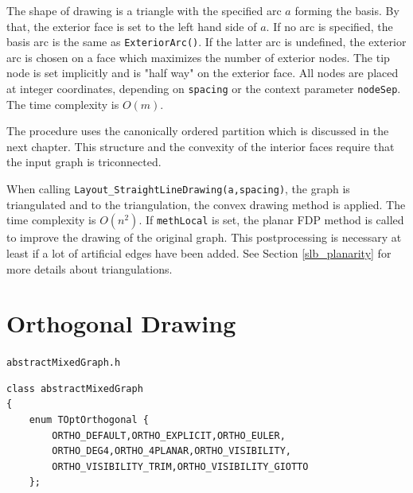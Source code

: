 \documentclass[a4paper,11pt,twoside]{book}
\begin{document}
\begin{multicols}{2}
The shape of drawing is a triangle with the specified arc $a$ forming the basis.
By that, the exterior face is set to the left hand side of $a$. If no arc is
specified, the basis arc is the same as \verb/ExteriorArc()/. If the latter arc
is undefined, the exterior arc is chosen on a face which maximizes the number
of exterior nodes. The tip node is set implicitly and is "half way" on the
exterior face. All nodes are placed at integer coordinates, depending on
\verb/spacing/ or the context parameter \verb/nodeSep/. The time complexity is
$O(m)$.

The procedure uses the canonically ordered partition which is discussed in the
next chapter. This structure and the convexity of the interior faces require
that the input graph is triconnected.

When calling \verb/Layout_StraightLineDrawing(a,spacing)/, the graph is
triangulated and to the triangulation, the convex drawing method is applied.
The time complexity is $O(n^2)$. If \verb/methLocal/ is set, the planar FDP
method is called to improve the drawing of the original graph. This
postprocessing is necessary at least if a lot of artificial edges have been
added. See Section \ref{slb_planarity} for more details about triangulations.


\clearpage
{}
\section{Orthogonal Drawing}
\label{slb_orthogonal_layout}
\myinclude\verb/abstractMixedGraph.h/
\begin{mymethods}
\begin{verbatim}
class abstractMixedGraph
{
    enum TOptOrthogonal {
        ORTHO_DEFAULT,ORTHO_EXPLICIT,ORTHO_EULER,
        ORTHO_DEG4,ORTHO_4PLANAR,ORTHO_VISIBILITY,
        ORTHO_VISIBILITY_TRIM,ORTHO_VISIBILITY_GIOTTO
    };


\end{verbatim}
\end{mymethods}
\end{multicols}
\end{document}
